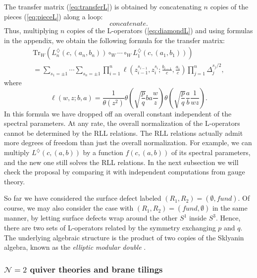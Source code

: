 The transfer matrix (\ref{eq:transferL}) is obtained by concatenating
$n$ copies of the pieces (\ref{eq:pieceL}) along a loop: 
\begin{equation}
concatenate.
\end{equation}
 Thus, multiplying $n$ copies of the L-operators (\ref{eq:diamondL})
and using formulas in the appendix, we obtain the following formula
for the transfer matrix:
\begin{multline}
    \mathrm{Tr}_{W}\left(  
      L_{n}^{\diamondsuit}\left(c,\left(a_{n},b_{n}\right)\right)
      \circ_{W}  \cdots  \circ_{W}
      L_{1}^{\diamondsuit}\left(c,\left(a_{1},b_{1}\right)\right)
    \right)  \\
    =  
      \sum_{s_{1}=\pm1}\cdots\sum_{s_{n}=\pm1}
      \prod_{i=1}^{n}\ell\left(z_{i-1}^{s_{i-1}},z_{i}^{s_{i}};\frac{b_{i-1}}{c},\frac{a_{i}}{c}\right)
      \prod_{j=1}^{n}\Delta_{j}^{s_{j}/2},  \label{eq:proposal}
\end{multline}
where 
\begin{equation}
    \ell\left(w,z;b,a\right)  
      =  
        \frac{1}{\theta(z^{2})}
        \theta\left(\sqrt{\frac{p}{q}}ba\frac{w}{z}\right)
        \theta\left(\sqrt{\frac{p}{q}}\frac{a}{b}\frac{1}{wz}\right).
\end{equation}
In this formula we have dropped off an overall constant independent
of the spectral parameters. At any rate, the overall normalization
of the L-operators cannot be determined by the RLL relations. The
RLL relations actually admit more degrees of freedom than just the
overall normalization. For example, we can multiply $L^{\diamondsuit}\left(c,\left(a,b\right)\right)$
by a function $f(c,(a,b))$ of its spectral parameters, and the new
one still solves the RLL relations. In the next subsection we will
check the proposal by comparing it with independent computations from
gauge theory. 

So far we have considered the surface defect labeled $\left( R_{1},R_{2} \right)=\left( \emptyset,fund \right)$.
Of course, we may also consider the case with $\left( R_{1},R_{2} \right)=\left( fund,\emptyset \right)$
in the same manner, by letting surface defects wrap around the other
$S^{1}$ inside $S^{3}$. Hence, there are two sets of L-operators
related by the symmetry exchanging $p$ and $q$. The underlying algebraic
structure is the product of two copies of the Sklyanin algebra, known
as the \emph{elliptic modular double} \cite{MR2492363}. 

\subsubsection{$\mathcal{N}=2$ quiver theories and brane tilings}

